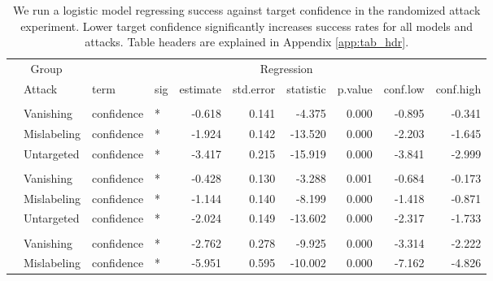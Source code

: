 \begingroup\fontsize{9}{11}\selectfont

\begin{longtable}[t]{llllrrrrrr}
\caption{\label{tab:target_conf_table}We run a logistic model regressing success against target confidence in the randomized attack experiment. Lower target confidence significantly increases success rates for all models and attacks. Table headers are explained in Appendix \ref{app:tab_hdr}.}\\
\toprule
\multicolumn{2}{c}{Group} & \multicolumn{8}{c}{Regression} \\
\cmidrule(l{3pt}r{3pt}){1-2} \cmidrule(l{3pt}r{3pt}){3-10}
 & Attack & term & sig & estimate & std.error & statistic & p.value & conf.low & conf.high\\
\midrule
\addlinespace[0.3em]
\multicolumn{10}{l}{\textbf{YOLOv3}}\\
\hspace{1em} & Vanishing & confidence & * & -0.618 & 0.141 & -4.375 & 0.000 & -0.895 & -0.341\\
\cmidrule{2-10}\nopagebreak
\hspace{1em} & Mislabeling & confidence & * & -1.924 & 0.142 & -13.520 & 0.000 & -2.203 & -1.645\\
\cmidrule{2-10}\nopagebreak
\hspace{1em} & Untargeted & confidence & * & -3.417 & 0.215 & -15.919 & 0.000 & -3.841 & -2.999\\
\cmidrule{1-10}\pagebreak[0]
\addlinespace[0.3em]
\multicolumn{10}{l}{\textbf{SSD}}\\
\hspace{1em} & Vanishing & confidence & * & -0.428 & 0.130 & -3.288 & 0.001 & -0.684 & -0.173\\
\cmidrule{2-10}\nopagebreak
\hspace{1em} & Mislabeling & confidence & * & -1.144 & 0.140 & -8.199 & 0.000 & -1.418 & -0.871\\
\cmidrule{2-10}\nopagebreak
\hspace{1em} & Untargeted & confidence & * & -2.024 & 0.149 & -13.602 & 0.000 & -2.317 & -1.733\\
\cmidrule{1-10}\pagebreak[0]
\addlinespace[0.3em]
\multicolumn{10}{l}{\textbf{RetinaNet}}\\
\hspace{1em} & Vanishing & confidence & * & -2.762 & 0.278 & -9.925 & 0.000 & -3.314 & -2.222\\
\cmidrule{2-10}\nopagebreak
\hspace{1em} & Mislabeling & confidence & * & -5.951 & 0.595 & -10.002 & 0.000 & -7.162 & -4.826\\

\end{longtable}
